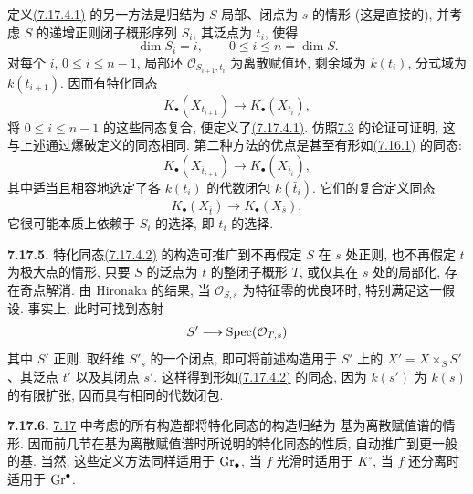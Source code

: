 定义\hyperlink{sga6.e10.eq.7-17-4-1}{(7.17.4.1)} 的另一方法是归结为 $S$ 局部、闭点为 $s$ 的情形 (这是直接的), 并考虑 $S$ 的递增正则闭子概形序列 $S_i$, 其泛点为 $t_i$, 使得
%
%
%
\[
\dim S_i=i,\qquad 0\leq i\leq n=\dim S.
\]
对每个 $i$, $0\leq i\leq n-1$, 局部环 $\mathcal O_{S_{i+1},t_i}$ 为离散赋值环, 剩余域为 $k(t_i)$, 分式域为 $k(t_{i+1})$. 因而有特化同态
%
%
%
\[
K_\bullet(X_{t_{i+1}})\longrightarrow K_\bullet(X_{t_i}),
\]
将 $0\leq i\leq n-1$ 的这些同态复合, 便定义了\hyperlink{sga6.e10.eq.7-17-4-1}{(7.17.4.1)}. 仿照\hyperlink{sga6.e10.prop.7-3}{7.3} 的论证可证明, 这与上述通过爆破定义的同态相同. 第二种方法的优点是甚至有形如\hyperlink{sga6.e10.eq.7-16-1}{(7.16.1)} 的同态:
%
%
%
%
\[
K_\bullet(X_{\bar t_{i+1}})\longrightarrow
K_\bullet(X_{\bar t_i}),
\]
其中适当且相容地选定了各 $k(t_i)$ 的代数闭包 $k(\bar t_i)$. 它们的复合定义同态
%
\begin{equation}\tag{7.17.4.2}
K_\bullet(X_{\bar t})\longrightarrow K_\bullet(X_{\bar s}),
\end{equation}
它很可能本质上依赖于 $S_i$ 的选择, 即 $t_i$ 的选择.
%

\textbf{7.17.5.} 特化同态\hyperlink{sga6.e10.eq.7-17-4-2}{(7.17.4.2)} 的构造可推广到不再假定 $S$ 在 $s$ 处正则, 也不再假定 $t$ 为极大点的情形, 只要 $S$ 的泛点为 $t$ 的整闭子概形 $T$, 或仅其在 $s$ 处的局部化, 存在奇点解消. 由 Hironaka 的结果, 当 $\mathcal O_{S,s}$ 为特征零的优良环时, 特别满足这一假设. 事实上, 此时可找到态射
%
%
%
%
%
%
%
\[
S'\longrightarrow\operatorname{Spec}(\mathcal O_{T,s})
\]
其中 $S'$ 正则. 取纤维 $S'_s$ 的一个闭点, 即可将前述构造用于 $S'$ 上的 $X'=X\times_SS'$、其泛点 $t'$ 以及其闭点 $s'$. 这样得到形如\hyperlink{sga6.e10.eq.7-17-4-2}{(7.17.4.2)} 的同态, 因为 $k(s')$ 为 $k(s)$ 的有限扩张, 因而具有相同的代数闭包.
%
%
%
%

\textbf{7.17.6.} \hyperlink{sga6.e10.sec.7.17}{7.17} 中考虑的所有构造都将特化同态的构造归结为
%
%
基为离散赋值谱的情形. 因而前几节在基为离散赋值谱时所说明的特化同态的性质, 自动推广到更一般的基. 当然, 这些定义方法同样适用于 $\operatorname{Gr}_\bullet$, 当 $f$ 光滑时适用于 $K^\circ$, 当 $f$ 还分离时适用于 $\operatorname{Gr}^\bullet$.
%
%
%
%
%

